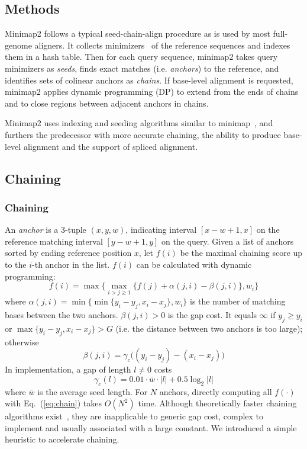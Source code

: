 \documentclass{bioinfo}
\begin{document}
\begin{methods}
\section{Methods}

Minimap2 follows a typical seed-chain-align procedure as is used by most
full-genome aligners. It collects minimizers~\citep{Roberts:2004fv} of the
reference sequences and indexes them in a hash table. Then for each query
sequence, minimap2 takes query minimizers as \emph{seeds}, finds exact matches
(i.e. \emph{anchors}) to the reference, and identifies sets of colinear anchors as
\emph{chains}. If base-level alignment is requested, minimap2 applies dynamic
programming (DP) to extend from the ends of chains and to close
regions between adjacent anchors in chains.

Minimap2 uses indexing and seeding algorithms similar to
minimap~\citep{Li:2016aa}, and furthers the predecessor with more accurate
chaining, the ability to produce base-level alignment and the support of
spliced alignment.

\subsection{Chaining}

\subsubsection{Chaining}
An \emph{anchor} is a 3-tuple $(x,y,w)$, indicating interval $[x-w+1,x]$ on the
reference matching interval $[y-w+1,y]$ on the query. Given a list of anchors
sorted by ending reference position $x$, let $f(i)$ be the maximal chaining
score up to the $i$-th anchor in the list. $f(i)$ can be calculated with
dynamic programming:
\begin{equation}\label{eq:chain}
f(i)=\max\big\{\max_{i>j\ge 1} \{ f(j)+\alpha(j,i)-\beta(j,i) \},w_i\big\}
\end{equation}
where $\alpha(j,i)=\min\big\{\min\{y_i-y_j,x_i-x_j\},w_i\big\}$ is the number of
matching bases between the two anchors. $\beta(j,i)>0$ is the gap cost. It
equals $\infty$ if $y_j\ge y_i$ or $\max\{y_i-y_j,x_i-x_j\}>G$ (i.e. the
distance between two anchors is too large); otherwise
\begin{equation}\label{eq:chain-gap}
\beta(j,i)=\gamma_c\big((y_i-y_j)-(x_i-x_j)\big)
\end{equation}
In implementation, a gap of length $l\not=0$ costs
\[
\gamma_c(l)=0.01\cdot \bar{w}\cdot|l|+0.5\log_2|l|
\]
where $\bar{w}$ is the average seed length. For $N$ anchors, directly computing all $f(\cdot)$ with
Eq.~(\ref{eq:chain}) takes $O(N^2)$ time. Although theoretically faster
chaining algorithms exist~\citep{Abouelhoda:2005aa}, they
are inapplicable to generic gap cost, complex to implement and usually
associated with a large constant. We introduced a simple heuristic to
accelerate chaining.


\end{methods}
\end{document}
